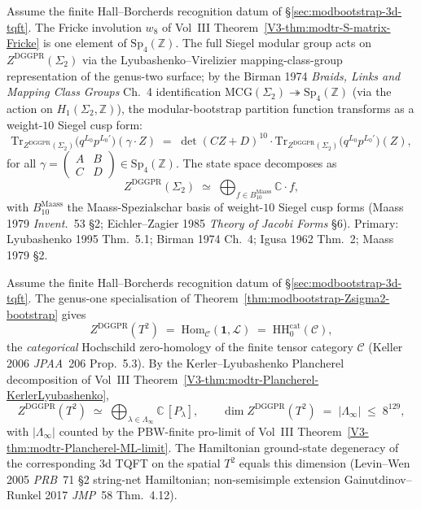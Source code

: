 \begin{remark}
\label{rem:modbootstrap-Sp4}
Assume the finite Hall--Borcherds recognition datum of
\S\ref{sec:modbootstrap-3d-tqft}.
The Fricke involution $w_8$ of Vol~III
Theorem~\ref{V3-thm:modtr-S-matrix-Fricke} is one element of
$\mathrm{Sp}_4(\mathbb Z)$. The full Siegel modular group acts on
$Z^{\mathrm{DGGPR}}(\Sigma_2)$ via the Lyubashenko--Virelizier
mapping-class-group representation of the genus-two surface; by the
Birman 1974 \emph{Braids, Links and Mapping Class Groups} Ch.~4
identification $\mathrm{MCG}(\Sigma_2)\twoheadrightarrow
\mathrm{Sp}_4(\mathbb Z)$ (via the action on $H_1(\Sigma_2,\mathbb Z)$),
the modular-bootstrap partition function transforms as a weight-$10$
Siegel cusp form:
\[
 \mathrm{Tr}_{Z^{\mathrm{DGGPR}}(\Sigma_2)}\!\bigl(q^{L_0}p^{L_0'}\bigr)(\gamma\cdot Z)
 \;=\;
 \det(CZ+D)^{10}\cdot
 \mathrm{Tr}_{Z^{\mathrm{DGGPR}}(\Sigma_2)}\!\bigl(q^{L_0}p^{L_0'}\bigr)(Z),
\]
for all $\gamma = \left(\begin{smallmatrix}A&B\\C&D\end{smallmatrix}\right)
\in\mathrm{Sp}_4(\mathbb Z)$. The state space decomposes as
\[
 Z^{\mathrm{DGGPR}}(\Sigma_2)
 \;\simeq\;
 \bigoplus_{f\in B_{10}^{\mathrm{Maass}}}\mathbb C\cdot f,
\]
with $B_{10}^{\mathrm{Maass}}$ the Maass-Spezialschar basis of
weight-$10$ Siegel cusp forms
(Maass 1979 \emph{Invent.}~53 \S 2; Eichler--Zagier 1985
\emph{Theory of Jacobi Forms} \S 6).
Primary: Lyubashenko 1995 Thm.~5.1; Birman 1974 Ch.~4; Igusa 1962
Thm.~2; Maass 1979 \S 2.
\end{remark}

\begin{remark}
\label{rem:modbootstrap-ZT2}
Assume the finite Hall--Borcherds recognition datum of
\S\ref{sec:modbootstrap-3d-tqft}.
The genus-one specialisation of
Theorem~\ref{thm:modbootstrap-Zsigma2-bootstrap} gives
\[
 Z^{\mathrm{DGGPR}}(T^2)
 \;=\;
 \mathrm{Hom}_{\mathcal C}(\mathbf 1, \mathcal L)
 \;=\;
 \mathrm{HH}_0^{\mathrm{cat}}(\mathcal C),
\]
the \emph{categorical} Hochschild zero-homology of the finite tensor
category $\mathcal C$ (Keller 2006 \emph{JPAA}~206 Prop.~5.3). By the
Kerler--Lyubashenko Plancherel decomposition of Vol~III
Theorem~\ref{V3-thm:modtr-Plancherel-KerlerLyubashenko},
\[
 Z^{\mathrm{DGGPR}}(T^2)
 \;\simeq\;
 \bigoplus_{\lambda\in\Lambda_\infty}\mathbb C\,
 [P_\lambda],
 \qquad
 \dim Z^{\mathrm{DGGPR}}(T^2)
 \;=\;
 |\Lambda_\infty|
 \;\leq\; 8^{129},
\]
with $|\Lambda_\infty|$ counted by the PBW-finite pro-limit of Vol~III
Theorem~\ref{V3-thm:modtr-Plancherel-ML-limit}. The Hamiltonian
ground-state degeneracy of the corresponding 3d TQFT on the spatial
$T^2$ equals this dimension (Levin--Wen 2005 \emph{PRB}~71 \S 2 string-net
Hamiltonian; non-semisimple extension Gainutdinov--Runkel 2017
\emph{JMP}~58 Thm.~4.12).
\end{remark}

